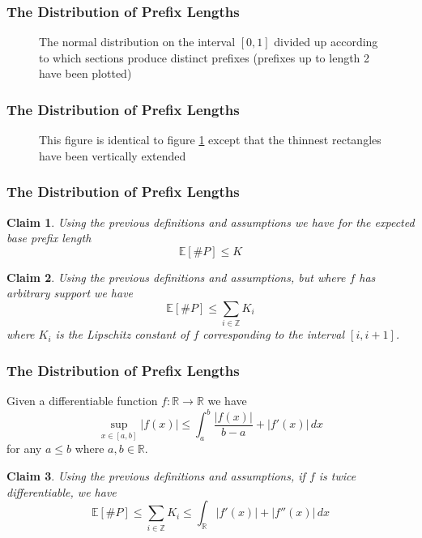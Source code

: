 \documentclass{beamer}
\newcommand{\ev}[2]{\underset{#1}{\mathbb{E}}\left[#2\right]}
\newtheorem{claim}{Claim}
\begin{document}
\begin{frame}
\frametitle{The Distribution of Prefix Lengths}
\begin{figure}
	\scalebox{0.77}{}
	\caption{The normal distribution on the interval $[0,1]$ divided up according to which sections produce distinct prefixes (prefixes up to length 2 have been plotted)}
	\label{fig:normal_bin_cover_2}\vspace{2em}
\end{figure}
\end{frame}

\begin{frame}
\frametitle{The Distribution of Prefix Lengths}
\begin{figure}
	\scalebox{0.77}{}
	\caption{This figure is identical to figure \ref{fig:normal_bin_cover_2} except that the thinnest rectangles have been vertically extended}
	\label{fig:normal_bin_cover_riemann}
\end{figure}
\end{frame}

\begin{frame}
\frametitle{The Distribution of Prefix Lengths}
\begin{claim}
	Using the previous definitions and assumptions we have for the expected base prefix length 
	\[
	\ev{}{\#P} \leq K
	\]
\end{claim}
\begin{claim}
	Using the previous definitions and assumptions, but where $f$ has arbitrary support we have
	\[
	\ev{}{\#P}\leq\sum_{i\in\mathbb{Z}} K_i
	\]
	where $K_i$ is the Lipschitz constant of $f$ corresponding to the interval $[i,i+1]$.
\end{claim}
\end{frame}

\begin{frame}
\frametitle{The Distribution of Prefix Lengths}
\begin{lemma}
	Given a differentiable function $f : \mathbb{R} \rightarrow \mathbb{R}$ we have
	\[
	\sup_{x\in[a,b]}|f(x)|\leq\int_a^b\frac{|f(x)|}{b-a}+|f'(x)|\,dx
	\]
	 for any $a\leq b$ where $a,b\in\mathbb{R}$.
\end{lemma}
\begin{claim}
	Using the previous definitions and assumptions, if $f$ is twice differentiable, we have
	\[
	\ev{}{\#P}\leq\sum_{i\in\mathbb{Z}} K_i\leq \int_\mathbb{R}|f'(x)|+|f''(x)|\,dx
	\]
\end{claim}
\end{frame}
\end{document}

